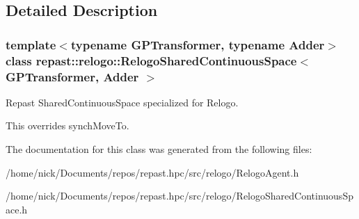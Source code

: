 \subsection{Detailed Description}
\subsubsection*{template$<$typename G\-P\-Transformer, typename Adder$>$class repast\-::relogo\-::\-Relogo\-Shared\-Continuous\-Space$<$ G\-P\-Transformer, Adder $>$}

Repast Shared\-Continuous\-Space specialized for Relogo. 

This overrides synch\-Move\-To. 

The documentation for this class was generated from the following files\-:\begin{DoxyCompactItemize}
\item 
/home/nick/\-Documents/repos/repast.\-hpc/src/relogo/Relogo\-Agent.\-h\item 
/home/nick/\-Documents/repos/repast.\-hpc/src/relogo/Relogo\-Shared\-Continuous\-Space.\-h\end{DoxyCompactItemize}
